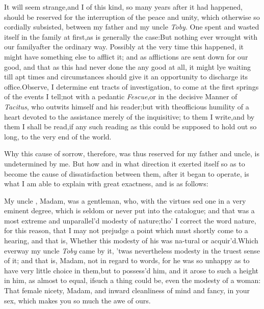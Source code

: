 \documentclass{article}
\begin{document}
It will seem strange,\tsh  and I\break 
{}
of this kind, so many years after it had happened,
should be reserved for the interruption of the peace and unity,
which otherwise so cordially subsisted, between my father and my
uncle \textit{Toby}. One\break
{}
spent and wasted itself in the family at
first,\tsk  as is generally the case:\tsk  But nothing ever
wrought with our family\break after the ordinary way. Possibly at the\pb
very time this happened, it might have something else to afflict
it; and as afflictions are sent down for our good, and that as this
had never done the  any
good at all, it might lye\break
waiting till apt times and circumstances should give it an
opportunity to discharge its office.\tsh  Observe, I
determine\break
{}
ent tracts of investigation, to come at
the first springs of the events I tell;\tsk\break  not with a pedantic
\textit{Fescue},\tsk  or in the decisive Manner of \textit{Tacitus},
who outwits himself and his reader;\tsk  but with the\break officious
humility of a heart devoted to the assistance merely of the
inquisitive;\tsk\break
to them I write,\tsh  and by them I
shall be read,\tsh  if any such reading as this could be
supposed to hold out so long,\break
to the very end of the
world.

\newpage
Why this cause of sorrow, therefore, was thus reserved for my
father and uncle, is undetermined by me. But how and in what
direction it exerted itself so as to become the cause of
dissatisfaction between them, after it began to operate, is what I
am able to explain with great exactness, and is as follows:

My uncle , Madam, was a
gentleman, who, with the virtues 
sed one in a very eminent degree,
which is seldom or never put into the catalogue; and that was a
most extreme and unparallel’d modesty of
nature;\tsh  tho’ I correct the word nature, for this
reason, that I may not prejudge a point which must shortly come to
a hearing, and that is, Whether this modesty of his was na-\pb tural or
acquir’d.\tsh  Which ever\break way my uncle \textit{Toby}
came by it, ’twas nevertheless modesty in the truest sense of
it; and that is, Madam, not in regard to words, for he was so
unhappy as to have very little choice in them,\tsk  but to
possess’d him, and
it arose to such a height in him, as almost to equal, if\break such a
thing could be, even the modesty of a woman: That female nicety,
Madam, and inward cleanliness of mind and fancy, in your sex, which
makes you so much the awe of ours.
\end{document}
